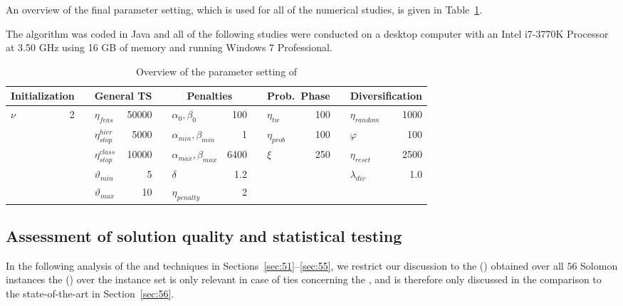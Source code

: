 \documentclass[11pt,a4paper,fleqn]{article}
\newcommand{\ra}[1]{\renewcommand{\arraystretch}{#1}}
\begin{document}
An overview of the final parameter setting, which is used for all of the numerical studies, is given in Table~\ref{tab:sudiesParameter}. 

The algorithm was coded in Java and all of the following studies were conducted on a desktop computer with an Intel i7-3770K Processor at 3.50 GHz using 16 GB of memory and running Windows 7 Professional.

\begin{table}[htbp]
\centering
\ra{1.2} 
\scriptsize
\begin{tabular}{@{}lrrlrrlrrlrrlr@{}} 
\toprule
\multicolumn{2}{c}{Initialization} & & \multicolumn{2}{c}{General TS}&&
\multicolumn{2}{c}{Penalties}& &\multicolumn{2}{c}{Prob.~Phase}& &\multicolumn{2}{c}{Diversification}\\ 
\midrule
$\nu$  & 2 && $\eta_{\mathit{feas}}$      & 50000 && $\alpha_{0}, \beta_{0}$                & 100 &&  $\eta_{\mathit{tw}}$  & 100 && $\eta_{\mathit{random}}$     & 1000  \\
   &  && $\eta^{\mathit{hier}}_{\mathit{stop}}$   & 5000  && $\alpha_{\mathit{min}},\beta_{\mathit{min}} $ & 1 &&  $\eta_{\mathit{prob}}$                     & 100    &&  $\varphi$       & 100 \\
      &   &&    $\eta^{\mathit{class}}_{\mathit{stop}}$ & 10000 && $\alpha_{\mathit{max}},\beta_{\mathit{max}} $ & 6400 &&                 $\xi$      & 250& &                    $\eta_{\mathit{reset}}$    & 2500     \\
   &   && $\vartheta_{\mathit{min}}$  & 5     && $\delta$                             & 1.2     &&                   &   &           &         $\lambda_{\mathit{div}}$    & 1.0    \\
&  && $\vartheta_{\mathit{max}}$  &  10 &&$\eta_{\mathit{penalty}}$ & 2&& &&&\\
\bottomrule
\end{tabular}
\caption{Overview of the parameter setting of \tsnew}
\label{tab:sudiesParameter}
\end{table}

\subsection{Assessment of solution quality and statistical testing}
\label{sec:assess}
In the following analysis of the \sms and techniques in Sections~\ref{sec:51}--\ref{sec:55}, we restrict our discussion to the {\cnv} (\cnvs)  obtained over all $56$ Solomon instances  the {\ctd} (\ctds) over the instance set is only relevant in case of ties concerning the \cnvs, and is therefore only discussed in the comparison to the state-of-the-art in Section~\ref{sec:56}.   
\end{document}
